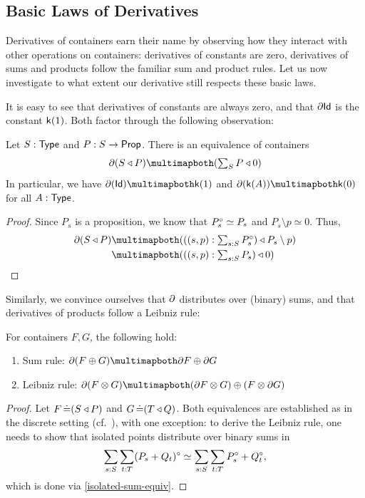 \subsection{Basic Laws of Derivatives}

Derivatives of containers earn their name by observing how they interact with other operations on containers:
derivatives of constants are zero, derivatives of sums and products follow the familiar sum and product rules.
Let us now investigate to what extent our derivative still respects these basic laws.

It is easy to see that derivatives of constants are always zero,
and that \( \partial{\mathsf{Id}} \) is the constant \( \mathsf{k}(1) \).
Both factor through the following observation:
\begin{proposition}\label{derivative-prop-trunc}
  Let \( S : \operatorname{\mathsf{Type}} \) and \( P : S \to \operatorname{\mathsf{Prop}} \).
  There is an equivalence of containers
  \[
    { \Der{(\MkCont{S}{P})} }
      \CartEquiv
    { (\MkCont{{\textstyle \sum_{S} P }}{0}) }
  \]
  In particular, we have
  \( \Der{(\Id)} \CartEquiv \CConst(1) \)
  and \( \Der(\CConst(A)) \CartEquiv \CConst(0) \) for all \( A : \operatorname{\mathsf{Type}} \).
  \begin{proof}
    Since \( P_s \) is a proposition, we know that \( P_s^{\circ} \simeq P_s \) and \( P_s \setminus p \simeq 0 \).
    Thus,
    \begin{align*}
      \Der{(\MkCont{S}{P})}
        &\CartEquiv (\MkCont{((s, p) : \textstyle\sum_{s : S} \Isolated{P_s})}{P_s \setminus p})
          \\
        &\CartEquiv (\MkCont{((s, p) : \textstyle\sum_{s : S} P_s)}{0})
          \qedhere
    \end{align*}
  \end{proof}
\end{proposition}

Similarly, we convince ourselves that \( \partial \) distributes over (binary) sums,
and that derivatives of products follow a Leibniz rule:
\begin{proposition}\label{sum-product-rule}\label{sum-rule}\label{leibniz-rule}
  For containers \( F, G \), the following hold:
  \begin{enumerate}
    \item Sum rule: \( {\Der{(F \CPlus G)}} \CartEquiv {\Der{F} \CPlus \Der{G}} \)
    \item Leibniz rule: \( {\Der{(F \CTimes G)}} \CartEquiv {(\Der{F} \CTimes G) \CPlus (F \CTimes \Der{G})} \)
  \end{enumerate}
  \begin{proof}
    Let \( F \operatorname{\mathrel{\doteq}} (S\mathbin{\triangleleft}P) \) and \( G \operatorname{\mathrel{\doteq}} (T\mathbin{\triangleleft}Q) \).
    Both equivalences are established as in the discrete setting
    (cf.~\cite[{Proposition 6.3 and 6.4}]{AbbottEtAl2005DataDifferentiating}),
    with one exception:
    to derive the Leibniz rule,
    one needs to show that isolated points distribute over binary sums in
    \[
      \sum_{s : S} \sum_{t : T} (P_s + Q_t)^{\circ}
        \simeq
      \sum_{s : S} \sum_{t : T} P_s^{\circ} + Q_t^{\circ},
    \]
    which is done via \autoref{isolated-sum-equiv}.
  \end{proof}
\end{proposition}

